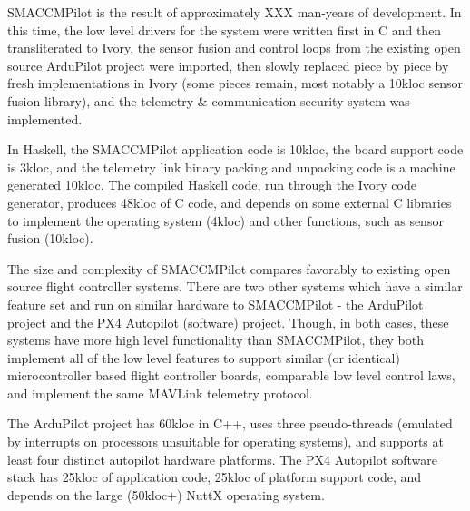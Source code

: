 SMACCMPilot is the result of approximately XXX man-years of development. In this
time, the low level drivers for the system were written first in C and then
transliterated to Ivory, the sensor fusion and control loops from the existing
open source ArduPilot project were imported, then slowly replaced piece by piece
by fresh implementations in Ivory (some pieces remain, most notably a 10kloc
sensor fusion library), and the telemetry & communication security system was
implemented.

In Haskell, the SMACCMPilot application code is 10kloc, the board support code
is 3kloc, and the telemetry link binary packing and unpacking code is a machine
generated 10kloc. The compiled Haskell code, run through the Ivory code
generator, produces 48kloc of C code, and depends on some external C libraries
to implement the operating system (4kloc) and other functions, such as sensor
fusion (10kloc).

The size and complexity of SMACCMPilot compares favorably to existing open
source flight controller systems. There are two other systems which have a
similar feature set and run on similar hardware to SMACCMPilot - the ArduPilot
project and the PX4 Autopilot (software) project. Though, in both cases, these
systems have more high level functionality than SMACCMPilot, they both implement
all of the low level features to support similar (or identical) microcontroller
based flight controller boards, comparable low level control laws, and implement
the same MAVLink telemetry protocol.

The ArduPilot project has 60kloc in C++, uses three pseudo-threads (emulated by
interrupts on processors unsuitable for operating systems), and supports at
least four distinct autopilot hardware platforms. The PX4 Autopilot software
stack has 25kloc of application code, 25kloc of platform support code, and
depends on the large (50kloc+) NuttX operating system.

